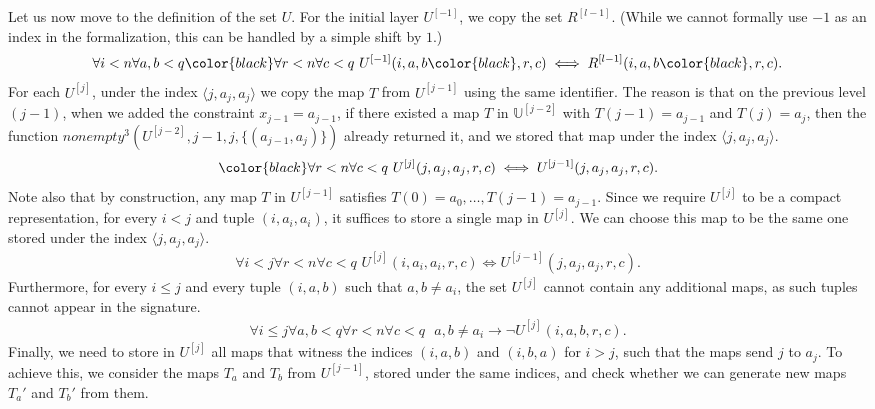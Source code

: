 \documentclass{article}
\newcommand{\bl}{\color{black}}
\theoremstyle{definition}
\theoremstyle{theorem}
\theoremstyle{theorem}
\theoremstyle{remark}
\theoremstyle{remark}
\theoremstyle{example}
\theoremstyle{notation}
\theoremstyle{theorem}
\begin{document}
Let us now move to the definition of the set $U$. For the initial layer $U^{[-1]}$, we copy the set $R^{[l-1]}$. (While we cannot formally use $-1$ as an index in the formalization, this can be handled by a simple shift by $1$.)
\begin{equation}
    \begin{gathered}
\forall i<n\forall a, b<q \bl\forall r<n\forall c<q \,\, U^{[-1]}( i,a,b\bl,r,c)\iff R^{[l-1]}( i,a,b\bl,r,c).       \end{gathered}
\end{equation} 
For each $U^{[j]}$, under the index $\langle j, a_j, a_j\rangle $ we copy the map $T$ from $U^{[j-1]}$ using the same identifier. The reason is that on the previous level $(j-1)$, when we added the constraint $x_{j-1} = a_{j-1}$, if there existed a map $T$ in $\mathbb{U}^{[j-2]}$ with $T(j-1) = a_{j-1}$ and $T(j) = a_j$, then the function $nonempty^3(U^{[j-2]}, j-1, j, \{(a_{j-1}, a_j)\})$ already returned it, and we stored that map under the index $\langle j, a_j, a_j\rangle$.
\begin{equation}
    \begin{gathered}
     \bl\forall r<n\forall c<q \,\, U^{[j]}(j,a_{j},a_{j}, r, c) \iff U^{[j-1]}(j,a_{j},a_{j}, r, c).
    \end{gathered}
\end{equation}
Note also that by construction, any map $T$ in $U^{[j-1]}$ satisfies $T(0) = a_0, \ldots, T(j-1) = a_{j-1}$. Since we require $U^{[j]}$ to be a compact representation, for every $i < j$ and tuple $(i, a_i, a_i)$, it suffices to store a single map in $U^{[j]}$. We can choose this map to be the same one stored under the index $\langle j, a_j, a_j\rangle$.
\begin{equation}
    \begin{gathered}
        \forall i<j\forall r<n\forall c<q\,\,U^{[j]}(i, a_i, a_i, r,c ) \iff U^{[j-1]}(j, a_j,a_j, r,c ).
    \end{gathered}
\end{equation}
Furthermore, for every $i \leq j$ and every tuple $(i, a, b)$ such that $a, b \neq a_i$, the set $U^{[j]}$ cannot contain any additional maps, as such tuples cannot appear in the signature.
\begin{equation}
    \begin{gathered}
        \forall i\leq j \forall a,b< q \forall r<n\forall c<q\,\,\,\,a,b\neq a_i \rightarrow \neg U^{[j]}(i, a, b, r,c ).
    \end{gathered}
\end{equation}
Finally, we need to store in $U^{[j]}$ all maps that witness the indices $(i, a, b)$ and $(i, b, a)$ for $i > j$, such that the maps send $j$ to $a_j$. To achieve this, we consider the maps $T_a$ and $T_b$ from $U^{[j-1]}$, stored under the same indices, and check whether we can generate new maps $T_a'$ and $T_b'$ from them.
\end{document}
